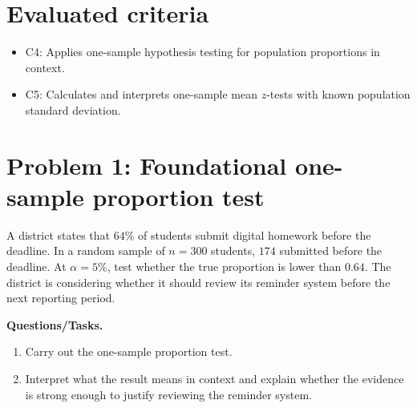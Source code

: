	\setcounter{tocdepth}{1}
	\setcounter{secnumdepth}{2}
	\tableofcontents
	
	\section*{Evaluated criteria}
	\begin{itemize}
		\item C4: Applies one-sample hypothesis testing for population proportions in context.
		\item C5: Calculates and interprets one-sample mean \(z\)-tests with known population standard deviation.
	\end{itemize}
	
	\section{Problem 1: Foundational one-sample proportion test}
	A district states that \(64\%\) of students submit digital homework before the deadline. In a random sample of \(n=300\) students, \(174\) submitted before the deadline. At \(\alpha=5\%\), test whether the true proportion is lower than \(0.64\). The district is considering whether it should review its reminder system before the next reporting period.
	
	\textbf{Questions/Tasks.}
	\begin{enumerate}
		\item[(a)] Carry out the one-sample proportion test.
		\item[(b)] Interpret what the result means in context and explain whether the evidence is strong enough to justify reviewing the reminder system.
	\end{enumerate}
	
